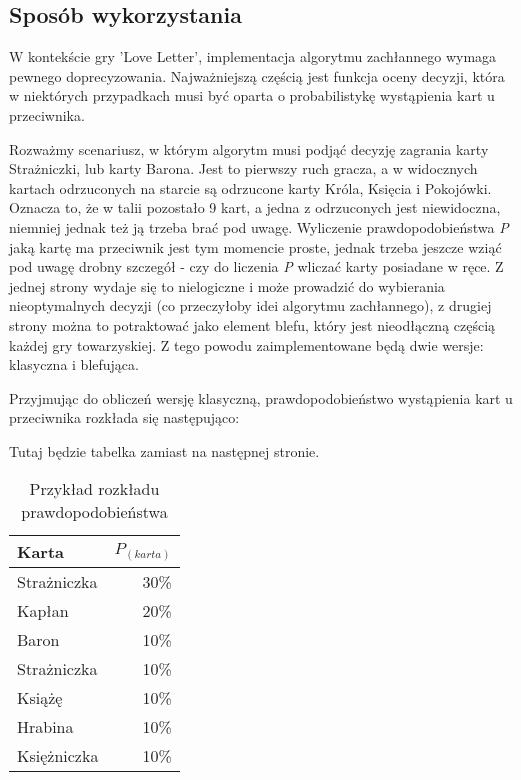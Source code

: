 \subsection{Sposób wykorzystania}

W kontekście gry 'Love Letter', implementacja algorytmu zachłannego wymaga pewnego doprecyzowania. Najważniejszą częścią jest funkcja oceny decyzji, która w niektórych przypadkach musi być oparta o probabilistykę wystąpienia kart u przeciwnika. 

Rozważmy scenariusz, w którym algorytm musi podjąć decyzję zagrania karty Strażniczki, lub karty Barona. Jest to pierwszy ruch gracza, a w widocznych kartach odrzuconych na starcie są odrzucone karty Króla, Księcia i Pokojówki. Oznacza to, że w talii pozostało 9 kart, a jedna z odrzuconych jest niewidoczna, niemniej jednak też ją trzeba brać pod uwagę. Wyliczenie prawdopodobieństwa \textit{P} jaką kartę ma przeciwnik jest tym momencie proste, jednak trzeba jeszcze wziąć pod uwagę drobny szczegół - czy do liczenia \textit{P} wliczać karty posiadane w ręce. Z jednej strony wydaje się to nielogiczne i może prowadzić do wybierania nieoptymalnych decyzji (co przeczyłoby idei algorytmu zachłannego), z drugiej strony można to potraktować jako element blefu, który jest nieodłączną częścią każdej gry towarzyskiej. Z tego powodu zaimplementowane będą dwie wersje: klasyczna i blefująca.

Przyjmując do obliczeń wersję klasyczną, prawdopodobieństwo wystąpienia kart u przeciwnika rozkłada się następująco:


\begin{center}
	Tutaj będzie tabelka zamiast na następnej stronie. %
\end{center}

\clearpage
\begin{table}[t]
	\caption{Przykład rozkładu prawdopodobieństwa}
	\centering
		\begin{tabular}{|l|r|}
			\hline
			Karta & $P_{(karta)}$	\\ \hline
			Strażniczka & 30\% 			\\ \hline
			Kapłan & 20\% 				\\ \hline
			Baron & 10\% 				\\ \hline
			Strażniczka & 10\% 			\\ \hline
			Książę & 10\% 				\\ \hline
			Hrabina & 10\% 				\\ \hline
			Księżniczka & 10\% 			\\ \hline
		\end{tabular}
\end{table}


